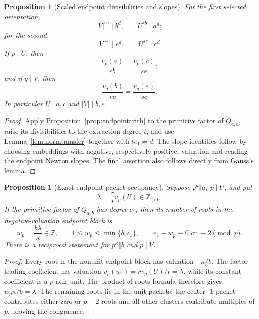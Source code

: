 \documentclass[11pt]{article}
\newtheorem{proposition}[theorem]{Proposition}
\theoremstyle{definition}
\newcommand{\Z}{\mathbb Z}
\begin{document}
\begin{proposition}[Scaled endpoint divisibilities and slopes]
\label{prop:scaledendpoint}
For the first selected orientation,
\begin{equation}
 |V|^{ra}\mid b^d,\qquad U^{rb}\mid a^d;
 \tag{19.4}
\end{equation}
for the second,
\begin{equation}
 |V|^{sc}\mid e^d,\qquad U^{se}\mid c^d.
 \tag{19.5}
\end{equation}
If \(p\mid U\), then
\begin{equation}
 \frac{v_p(a)}{rb}=\frac{v_p(c)}{se};
 \tag{19.6}
\end{equation}
and if \(q\mid V\), then
\begin{equation}
 \frac{v_q(b)}{ra}=\frac{v_q(e)}{sc}.
 \tag{19.7}
\end{equation}
In particular \(U\mid a,c\) and \(|V|\mid b,e\).
\end{proposition}

\begin{proof}
Apply Proposition~\ref{prop:endpointarith} to the primitive factor of
\(Q_{a,b}\), raise its divisibilities to the extraction degree \(t\), and
use Lemma~\ref{lem:normtransfer} together with \(te_1=d\).  The slope
identities follow by choosing embeddings with negative, respectively
positive, valuation and reading the endpoint Newton slopes.  The final
assertion also follows directly from Gauss's lemma.
\end{proof}

\begin{proposition}[Exact endpoint packet occupancy]
\label{prop:packetoccupancy}
Suppose \(p^\kappa\Vert a\), \(p\mid U\), and put
\[
 \lambda=\frac r t v_p(U)\in\Z_{>0}.
\]
If the primitive factor of \(Q_{a,b}\) has degree \(e_1\), then its number
of roots in the negative-valuation endpoint block is
\begin{equation}
 w_p=\frac{b\lambda}{\kappa}\in\Z,
 \qquad 1\leq w_p\leq\min\{b,e_1\},
 \qquad e_1-w_p\equiv0\text{ or }-2\pmod p.
 \tag{19.8}
\end{equation}
There is a reciprocal statement for \(p^\kappa\Vert b\) and \(p\mid V\).
\end{proposition}

\begin{proof}
Every root in the nonunit endpoint block has valuation \(-\kappa/b\).
The factor leading coefficient has valuation
\(v_p(u_1)=rv_p(U)/t=\lambda\), while its constant coefficient is a
\(p\)-adic unit.  The product-of-roots formula therefore gives
\(w_p\kappa/b=\lambda\).  The remaining roots lie in the unit packets; the
center-
\(1\) packet contributes either zero or \(p-2\) roots and all other
clusters contribute multiples of \(p\), proving the congruence.
\end{proof}
\end{document}
